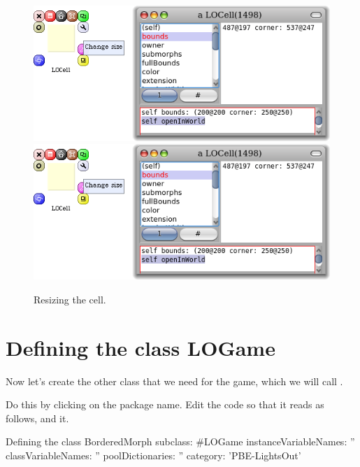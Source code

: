 \documentclass[a4paper,10pt,twoside]{book}
\begin{document}
\begin{figure}[htbp]
\centering
\ifluluelse
	{\includegraphics[width=\textwidth]{LOCellResize} }
	{\includegraphics[scale=0.7]{LOCellResize} }
\caption{Resizing the cell.\label{fig:cellresize}}
\end{figure}


\section{Defining the class LOGame}

Now let's create the other class that we need for the game, which we will call .

Do this by clicking on the package name.
Edit the code so that it reads as follows, and  it.

\begin{classdef}[sbegame]{Defining the  class}
BorderedMorph subclass: #LOGame
   instanceVariableNames: ''
   classVariableNames: ''
   poolDictionaries: ''
   category: 'PBE-LightsOut'
\end{classdef}
\end{document}
